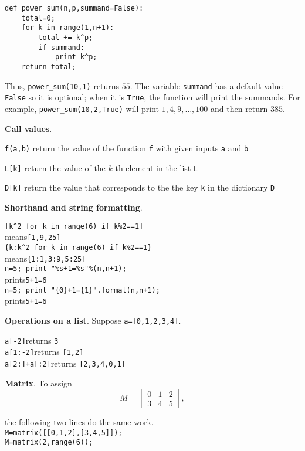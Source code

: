 \documentclass{article}
\newcommand{\heading}[1]{\medskip\textbf{#1}.}
\newenvironment{lwdes}{\begin{description}[leftmargin=1.7cm,align=left,labelwidth=1.5cm]}{\end{description}}
\begin{document}
\begin{multicols}{2}
\begin{verbatim}
def power_sum(n,p,summand=False):
    total=0;
    for k in range(1,n+1):
        total += k^p;
        if summand:
            print k^p;
    return total;
\end{verbatim}

Thus, \verb|power_sum(10,1)| returns $55$.  The variable \texttt{summand} has a default value \texttt{False} so it is optional; when it is \texttt{True}, the function will print the summands.  For example, \verb|power_sum(10,2,True)| will print $1,4,9,\ldots,100$ and then return $385$.


\heading{Call values}
\begin{lwdes}
\item[\texttt{f(a,b)}] return the value of the function \texttt{f} with given inputs \texttt{a} and \texttt{b}
\item[\texttt{L[k]}] return the value of the $k$-th element in the list \texttt{L}
\item[\texttt{D[k]}] return the value that corresponds to the the key \texttt{k} in the dictionary \texttt{D}
\end{lwdes}

\heading{Shorthand and string formatting}

\begin{obeylines}
\verb|[k^2 for k in range(6) if k%2==1]|
means\hfill \verb|[1,9,25]|
\verb|{k:k^2 for k in range(6) if k%2==1}|
means\hfill \verb|{1:1,3:9,5:25]|
\verb|n=5; print "%s+1=%s"%(n,n+1);|
prints\hfill \verb|5+1=6|
\verb|n=5; print "{0}+1={1}".format(n,n+1);|
prints\hfill \verb|5+1=6|
\end{obeylines}

\heading{Operations on a list}
Suppose \texttt{a=[0,1,2,3,4]}.
\begin{obeylines}
\verb|a[-2]|\hfill returns \verb|3|
\verb|a[1:-2]|\hfill returns \verb|[1,2]|
\verb|a[2:]+a[:2]|\hfill returns \verb|[2,3,4,0,1]|
\end{obeylines}
\columnbreak

\heading{Matrix}
To assign 
\[M=\begin{bmatrix}0&1&2\\3&4&5\end{bmatrix},\]
\begin{obeylines}
the following two lines do the same work.
\verb|M=matrix([[0,1,2],[3,4,5]]);|
\verb|M=matrix(2,range(6));|
\end{obeylines}


\end{multicols}
\end{document}
